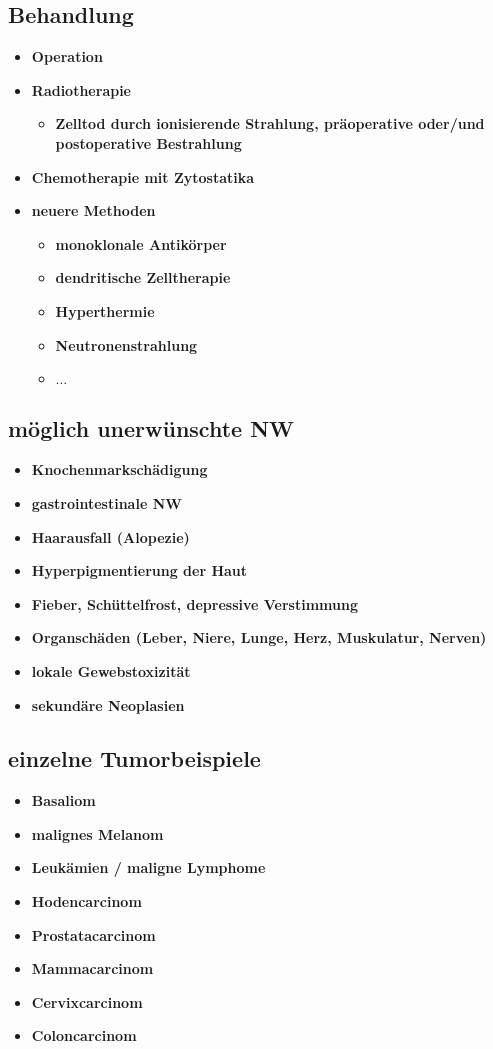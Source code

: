	\subsection{Behandlung}
		\begin{itemize}
			\item \textbf{Operation}
			\item \textbf{Radiotherapie}
				\begin{itemize}
					\item \textbf{Zelltod durch ionisierende Strahlung, präoperative oder/und postoperative Bestrahlung}
				\end{itemize}
			\item \textbf{Chemotherapie mit Zytostatika}
			\item \textbf{neuere Methoden}
				\begin{itemize}
					\item \textbf{monoklonale Antikörper}
					\item \textbf{dendritische Zelltherapie}
					\item \textbf{Hyperthermie}
					\item \textbf{Neutronenstrahlung}
					\item \textbf{$\dots$}
				\end{itemize}
		\end{itemize}
	\subsection{möglich unerwünschte NW}
		\begin{itemize}
			\item \textbf{Knochenmarkschädigung}
			\item \textbf{gastrointestinale NW}
			\item \textbf{Haarausfall (Alopezie)}
			\item \textbf{Hyperpigmentierung der Haut}
			\item \textbf{Fieber, Schüttelfrost, depressive Verstimmung}
			\item \textbf{Organschäden (Leber, Niere, Lunge, Herz, Muskulatur, Nerven)}
			\item \textbf{lokale Gewebstoxizität}
			\item \textbf{sekundäre Neoplasien}
		\end{itemize}
	\subsection{einzelne Tumorbeispiele}
		\begin{itemize}
			\item \textbf{Basaliom}
			\item \textbf{malignes Melanom}
			\item \textbf{Leukämien / maligne Lymphome}
			\item \textbf{Hodencarcinom}
			\item \textbf{Prostatacarcinom}
			\item \textbf{Mammacarcinom}
			\item \textbf{Cervixcarcinom}
			\item \textbf{Coloncarcinom}
		\end{itemize}